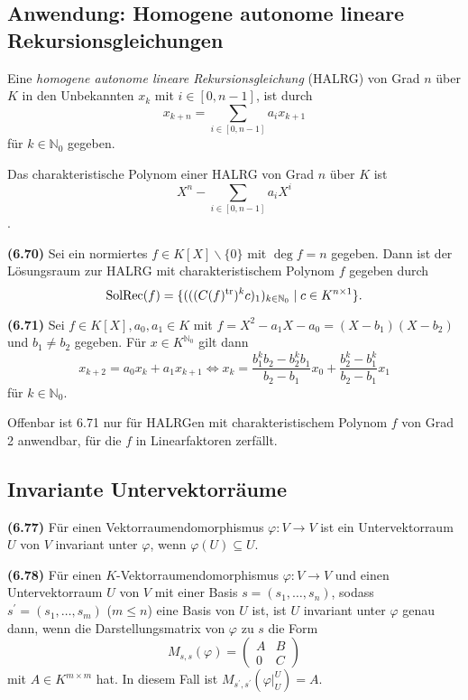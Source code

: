 \documentclass[a4paper,parskip=half*,DIV=15,fontsize=11pt]{scrartcl}
\newlength{\hangwidth}
\newcommand{\skript}[1]{\settowidth{\hangwidth}{\textbf{(#1)} }\hangpara{\hangwidth}{1}\textbf{(#1)} \ignorespaces} %
\newcommand{\SolRec}{\mathrm{SolRec}} %
\newcommand{\N}{\mathbb{N}}
\newcommand{\transpose}[1]{#1^{\mathrm{tr}}}
\DeclarePairedDelimiter\set{\{}{\}} %
\begin{document}
\subsection{Anwendung: Homogene autonome lineare Rekursionsgleichungen}
Eine \textit{homogene autonome lineare Rekursionsgleichung} (HALRG) von Grad $n$ über $K$ in den Unbekannten $x_k$ mit $i \in [0, n-1]$, ist durch $$x_{k+n} = \sum_{i \in [0,n-1]} a_ix_{k+1}$$ für $k \in \N_0$ gegeben.

Das charakteristische Polynom einer HALRG von Grad $n$ über $K$ ist $$X^n - \sum_{i \in [0, n-1]}a_i X^i$$.

\skript{6.70} Sei ein normiertes $f \in K[X]\backslash\{0\}$ mit $\deg{f} = n$ gegeben. Dann ist der Lösungsraum zur HALRG mit charakteristischem Polynom $f$ gegeben durch $$\SolRec(f) = \set{ (((\transpose{C(f)})^k c)_1)_{k\in\N_0} \;|\; c \in K^{n \times 1} }.$$

\skript{6.71} Sei $f \in K[X], a_0, a_1 \in K$ mit $f = X^2 - a_1X - a_0 = (X - b_1)(X - b_2)$ und $b_1 \neq b_2$ gegeben.  Für $x \in K^{\N_0}$ gilt dann $$x_{k+2} = a_0x_k + a_1x_{k+1} \iff x_k = \frac{b_1^kb_2 - b_2^kb_1}{b_2 - b_1}x_0 + \frac{b_2^k - b_1^k}{b_2 - b_1}x_1$$ für $k \in \N_0$.

Offenbar ist 6.71 nur für HALRGen mit charakteristischem Polynom $f$ von Grad 2 anwendbar, für die $f$ in Linearfaktoren zerfällt.

\subsection{Invariante Untervektorräume}

\skript{6.77} Für einen Vektorraumendomorphismus $\varphi: V \to V$ ist ein Untervektorraum $U$ von $V$ invariant unter $\varphi$, wenn
$\varphi(U) \subseteq U$.

\skript{6.78} Für einen $K$-Vektorraumendomorphismus $\varphi: V \to V$ und einen Untervektorraum $U$ von $V$ mit einer Basis $s = (s_1,\ldots, s_n)$, sodass $s^\prime = (s_1,\ldots,s_m)$ ($m \leq n$) eine Basis von $U$ ist, ist $U$ invariant unter $\varphi$ genau dann, wenn die Darstellungsmatrix von $\varphi$ zu $s$ die Form
$$M_{s,s}(\varphi) = \left(\begin{array}{cc}
		A & B	\\
		0 & C
	\end{array}\right)$$
mit $A \in K^{m \times m}$ hat. In diesem Fall ist $M_{s^\prime,s^\prime}(\varphi\vert_U^U) = A$.
\end{document}
